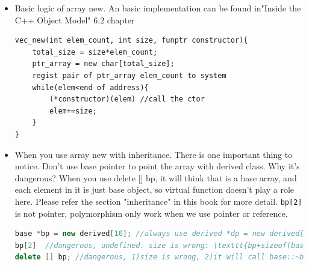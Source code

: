 \documentclass[a4paper,11pt,twoside]{book}
\begin{document}
\begin{itemize}
	\item Basic logic of array new. An basic implementation can be found in"Inside the C++ Object Model" 6.2 chapter
\begin{lstlisting}[numbers=none]
vec_new(int elem_count, int size, funptr constructor){
	total_size = size*elem_count;
	ptr_array = new char[total_size];
	regist pair of ptr_array elem_count to system
	while(elem<end of address){
		(*constructor)(elem) //call the ctor
		elem+=size;
	}
}	
\end{lstlisting}
	
	\item When you use array new with inheritance. There is one important thing to notice. Don't use base pointer to point the array with derived class. Why it's dangerous? When you use delete [] bp, it will think that is a base array, and each element in it is just base object, so virtual function doesn't play a role here. Please refer the section "inheritance" in this book for more detail. \texttt{bp[2]} is not pointer, polymorphism only work when we use pointer or reference.
\begin{lstlisting}[frame=single, language=c++]
base *bp = new derived[10]; //always use derived *dp = new derived[10]
bp[2]  //dangerous, undefined. size is wrong: \texttt{bp+sizeof(base)*2}
delete [] bp; //dangerous, 1)size is wrong, 2)it will call base::~base() destructor	
\end{lstlisting}	
	
\end{itemize}
\end{document}
